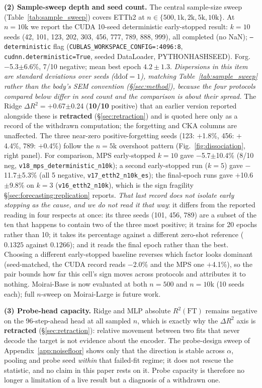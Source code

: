 \textbf{(2) Sample-sweep depth and seed count.}
The central sample-size sweep (Table~\ref{tab:sample_sweep}) covers
ETTh2 at $n \in \{500, 1\text{k}, 2\text{k}, 5\text{k}, 10\text{k}\}$.
At $n{=}10$k we report the CUDA 10-seed deterministic early-stopped result:
$k{=}10$ seeds (42, 101, 123, 202, 303, 456, 777, 789, 888, 999),
all completed (no NaN); \texttt{--deterministic} flag
(\texttt{CUBLAS\_WORKSPACE\_CONFIG=:4096:8}, \texttt{cudnn.deterministic=True},
seeded DataLoader, PYTHONHASHSEED).
Forg.\ $-$5.3$\pm$6.6\%, 7/10 negative; mean best epoch $4.2{\pm}1.3$.
\emph{Dispersions in this item are standard deviations over seeds
($\text{ddof}{=}1$), matching Table~\ref{tab:sample_sweep} rather than the body's
SEM convention (\S\ref{sec:method}), because the four protocols compared below
differ in seed count and the comparison is about their spread.}
The Ridge $\Delta R^2{=}{+}$0.67$\pm$0.24 (\textbf{10/10} positive) that an
earlier version reported alongside these is \textbf{retracted}
(\S\ref{sec:retraction}) and is quoted here only as a record of the withdrawn
computation; the forgetting and CKA columns are unaffected.
The three near-zero positive-forgetting seeds (123: $+$1.8\%, 456: $+$4.4\%, 789: $+$0.4\%)
follow the $n{=}5$k overshoot pattern (Fig.~\ref{fig:dissociation}, right panel).
For comparison, MPS early-stopped $k{=}10$ gave $-$5.7$\pm$10.4\% (8/10 neg,
\texttt{v18\_mps\_deterministic\_n10k}); a second early-stopped run ($k{=}5$) gave
$-$11.7$\pm$5.3\% (all 5 negative, \texttt{v17\_etth2\_n10k\_es}); the
final-epoch runs gave $+$10.6$\pm$9.8\% on $k{=}3$
(\texttt{v16\_etth2\_n10k}), which is the sign fragility
\S\ref{sec:forecasting:replication} reports.  \emph{That last record does not
isolate early stopping as the cause, and we do not read it that way}: it differs
from the reported reading in four respects at once: its three seeds
(101, 456, 789) are a subset of the ten that happens to contain two of the three
most positive; it trains for 20 epochs rather than 10; it takes its percentage
against a different zero-shot reference ($0.1325$ against $0.1266$); and it reads
the final epoch rather than the best.  Choosing a different early-stopped baseline
reverses which factor looks dominant (seed-matched, the CUDA record reads
$-$2.0\% and the MPS one $+$4.1\%), so the pair bounds how far this cell's sign
moves across protocols and attributes it to nothing.
Moirai-Base is now evaluated at both $n{=}500$ and $n{=}10$k (10 seeds each);
full $n$-sweep on Moirai-Large is future work.

\textbf{(3) Probe-head capacity.}
Ridge and MLP absolute $R^2(\text{FT})$ remains negative on the
96-step-ahead head at all sampled $n$, which is exactly why the
$\Delta R^2$ axis is \textbf{retracted} (\S\ref{sec:retraction}): relative
movement between two fits that never decode the target is not evidence about
the encoder. The probe-design sweep of Appendix~\ref{app:noisefloor} shows
only that the direction is stable across $\alpha$, pooling and probe seed
\emph{within} that failed-fit regime; it does not rescue the statistic, and no
claim in this paper rests on it. Probe capacity is therefore no longer a
limitation of a live result but a diagnosis of a withdrawn one.

